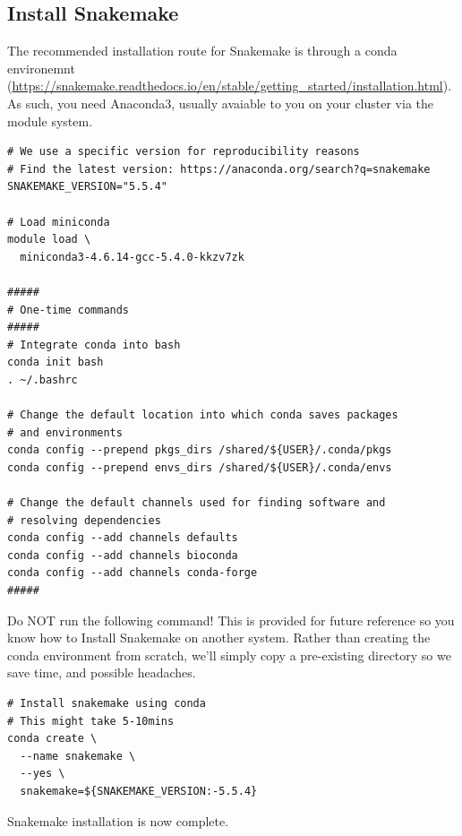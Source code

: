 \subsection{Install Snakemake}

The recommended installation route for Snakemake is through a conda environemnt
(\url{https://snakemake.readthedocs.io/en/stable/getting_started/installation.html}). As such, you need
Anaconda3, usually avaiable to you on your cluster via the module system.

\begin{steps}
\begin{lstlisting}
# We use a specific version for reproducibility reasons
# Find the latest version: https://anaconda.org/search?q=snakemake
SNAKEMAKE_VERSION="5.5.4"

# Load miniconda
module load \
  miniconda3-4.6.14-gcc-5.4.0-kkzv7zk

#####
# One-time commands
#####
# Integrate conda into bash
conda init bash
. ~/.bashrc

# Change the default location into which conda saves packages
# and environments
conda config --prepend pkgs_dirs /shared/${USER}/.conda/pkgs
conda config --prepend envs_dirs /shared/${USER}/.conda/envs

# Change the default channels used for finding software and
# resolving dependencies
conda config --add channels defaults
conda config --add channels bioconda
conda config --add channels conda-forge
#####
\end{lstlisting}

\end{steps}

\begin{warning}

Do NOT run the following command! This is provided for future reference so you know how to Install Snakemake on another system. Rather than
creating the conda environment from scratch, we'll simply copy a pre-existing directory so we save time, and possible headaches.

\begin{lstlisting}
# Install snakemake using conda
# This might take 5-10mins
conda create \
  --name snakemake \
  --yes \
  snakemake=${SNAKEMAKE_VERSION:-5.5.4}
\end{lstlisting}

Snakemake installation is now complete.

\end{warning}

